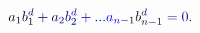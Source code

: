 \documentclass[12pt]{article}
\begin{document}
\makeatletter
\renewcommand*{\@textcolor}[3]{%
  \protect\leavevmode
  \begingroup
    \color#1{#2}#3%
  \endgroup
}
\makeatother
\begin{displaymath}
\mathcolor[RGB]{0,0,15}{a} _ { \mathcolor[RGB]{0,0,30}{1} } \mathcolor[RGB]{0,0,45}{b} _ { \mathcolor[RGB]{0,0,60}{1} } ^ { \mathcolor[RGB]{0,0,75}{d} } \mathcolor[RGB]{0,0,90}{+} \mathcolor[RGB]{0,0,105}{a} _ { \mathcolor[RGB]{0,0,120}{2} } \mathcolor[RGB]{0,0,135}{b} _ { \mathcolor[RGB]{0,0,150}{2} } ^ { \mathcolor[RGB]{0,0,165}{d} } \mathcolor[RGB]{0,0,180}{+} \mathcolor[RGB]{0,0,195}{.} \mathcolor[RGB]{0,0,210}{.} \mathcolor[RGB]{0,0,225}{.} \mathcolor[RGB]{0,0,240}{a} _ { \mathcolor[RGB]{0,0,255}{n} \mathcolor[RGB]{0,15,0}{-} \mathcolor[RGB]{0,15,15}{1} } \mathcolor[RGB]{0,15,30}{b} _ { \mathcolor[RGB]{0,15,45}{n} \mathcolor[RGB]{0,15,60}{-} \mathcolor[RGB]{0,15,75}{1} } ^ { \mathcolor[RGB]{0,15,90}{d} } \mathcolor[RGB]{0,15,105}{=} \mathcolor[RGB]{0,15,120}{0} \mathcolor[RGB]{0,15,135}{.}
\end{displaymath}
\end{document}
